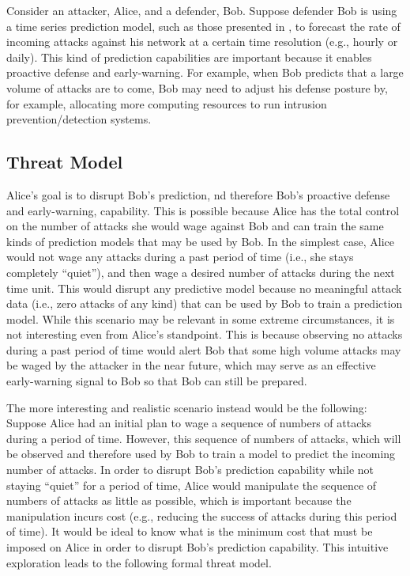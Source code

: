 \documentclass[journal]{IEEEtran}
\begin{document}
Consider an attacker, Alice, and a defender, Bob. Suppose defender Bob is using a time series prediction model, such as those presented in \cite{XuTIFS2013,XuTIFS2015,xu2018modeling,bakdash2018malware}, to forecast the rate of incoming attacks against his network at a certain time resolution (e.g., hourly or daily). This kind of prediction capabilities are important because it enables proactive defense and early-warning. For example, when Bob predicts that a large volume of attacks are to come, Bob may need to adjust his defense posture by, for example, allocating more computing resources to run intrusion prevention/detection systems.

\subsection{Threat Model}

Alice's goal is to disrupt Bob's prediction, nd therefore Bob's proactive defense and early-warning, capability. This is possible because Alice has the total control on the number of attacks she would wage against Bob and can train the same kinds of prediction models that may be used by Bob. 
In the simplest case, Alice would not wage any attacks during a past period of time (i.e., she stays completely ``quiet''), and then wage a desired number of attacks during the next time unit. This would disrupt any predictive model because no meaningful attack data (i.e., zero attacks of any kind) that can be used by Bob to train a prediction model. While this scenario may be relevant in some extreme circumstances, it is not interesting even from Alice's standpoint. This is because observing no attacks during a past period of time would alert Bob that some high volume attacks may be waged by the attacker in the near future, which may serve as an effective early-warning signal to Bob so that Bob can still be prepared.

The more interesting and realistic scenario instead would be the following: Suppose Alice had an initial plan to wage a sequence of numbers of attacks during a period of time. However, this sequence of numbers of attacks, which will be observed and therefore used by Bob to train a model to predict the incoming number of attacks. In order to disrupt Bob's prediction capability while not staying ``quiet'' for a period of time, Alice would manipulate the sequence of numbers of attacks as little as possible, which is important because the manipulation incurs cost (e.g., reducing the success of attacks during this period of time). It would be ideal to know what is the minimum cost that must be imposed on Alice in order to disrupt Bob's prediction capability. This intuitive exploration leads to the following formal threat model.
\end{document}
